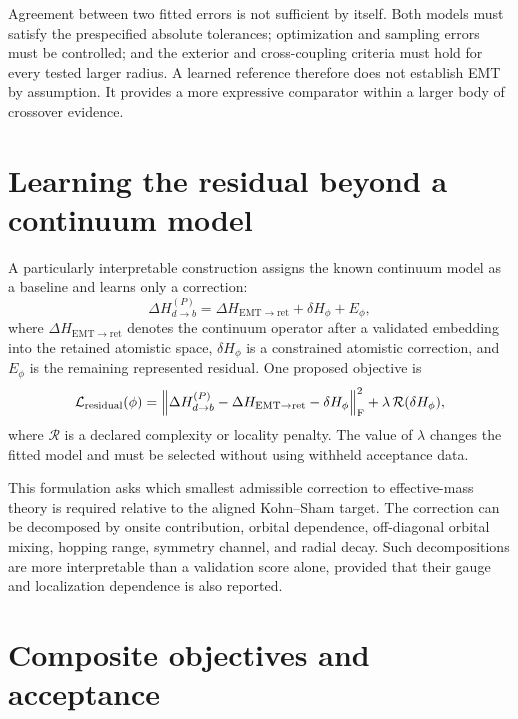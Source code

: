 Agreement between two fitted errors is not sufficient by itself. Both models
must satisfy the prespecified absolute tolerances; optimization and
sampling errors must be controlled; and the exterior and cross-coupling
criteria must hold for every tested larger radius. A learned reference therefore
does not establish EMT by assumption. It provides a more expressive comparator
within a larger body of crossover evidence.

\section{Learning the residual beyond a continuum model}

A particularly interpretable construction assigns the known continuum model as
a baseline and learns only a correction:
\begin{equation}
  \Delta H_{d\to b}^{(P)}
  =
  \Delta H_{\mathrm{EMT}\to\mathrm{ret}}
  +\delta H_{\phi}
  +E_{\phi},
  \label{eq:emt-residual-decomposition}
\end{equation}
where $\Delta H_{\mathrm{EMT}\to\mathrm{ret}}$ denotes the continuum operator
after a validated embedding into the retained atomistic space, $\delta H_{\phi}$ is a constrained
atomistic correction, and $E_{\phi}$ is the remaining represented residual.
One proposed objective is
\begin{equation}
  \mathcal L_{\rm residual}(\phi)
  =
  \left\|
    \Delta H_{d\to b}^{(P)}
    -\Delta H_{\mathrm{EMT}\to\mathrm{ret}}
    -\delta H_{\phi}
  \right\|_{\mathrm F}^{2}
  +\lambda\,\mathcal R(\delta H_{\phi}),
  \label{eq:residual-learning-loss}
\end{equation}
where $\mathcal R$ is a declared complexity or locality penalty. The value of
$\lambda$ changes the fitted model and must be selected without using withheld
acceptance data.

This formulation asks which smallest admissible correction to effective-mass
theory is required relative to the aligned Kohn--Sham target. The correction can
be decomposed by onsite contribution, orbital dependence, off-diagonal orbital
mixing, hopping range, symmetry channel, and radial decay. Such decompositions
are more interpretable than a validation score alone, provided that their gauge
and localization dependence is also reported.

\section{Composite objectives and acceptance}

